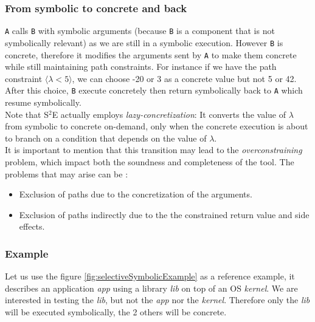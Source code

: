 \documentclass[11pt, conference]{IEEEtran}
\begin{document}
    		\subsubsection*{From symbolic to concrete and back}
    			\texttt{A} calls \texttt{B} with symbolic arguments (because \texttt{B} is a component that is not symbolically relevant) as we are still in a symbolic execution. However \texttt{B} is concrete, therefore it modifies the arguments sent by \texttt{A} to make them concrete while still maintaining path constraints. For instance if we have the path constraint  $\langle \lambda < 5 \rangle$, we can choose -20 or 3 as a concrete value but not 5 or 42.\\
    			After this choice, \texttt{B} execute concretely then return symbolically back to \texttt{A} which resume symbolically.\\
    			Note that S$^2$E actually employs \emph{lazy-concretization}: It converts the value of $\lambda$ from symbolic to concrete on-demand, only when the concrete execution is about to branch on a condition that depends on the value of $\lambda$. \\

    			It is important to mention that this transition may lead to the \emph{overconstraining} problem, which impact both the soundness and completeness of the tool. The problems that may arise can be :
    			\begin{itemize}
    				\item Exclusion of paths due to the concretization of the arguments.
    				\item Exclusion of paths indirectly due to the the constrained return value
and side effects.
    			\end{itemize}

    	\subsubsection{Example}
    	\label{subsec:S2EExample}
    		Let us use the figure \ref{fig:selectiveSymbolicExample} as a reference example, it describes an application \emph{app} using a library \emph{lib} on top of an OS \emph{kernel}. We are interested in testing the \emph{lib}, but not the \emph{app} nor the \emph{kernel}. Therefore only the \emph{lib} will be executed symbolically, the 2 others will be concrete.\\
\end{document}
